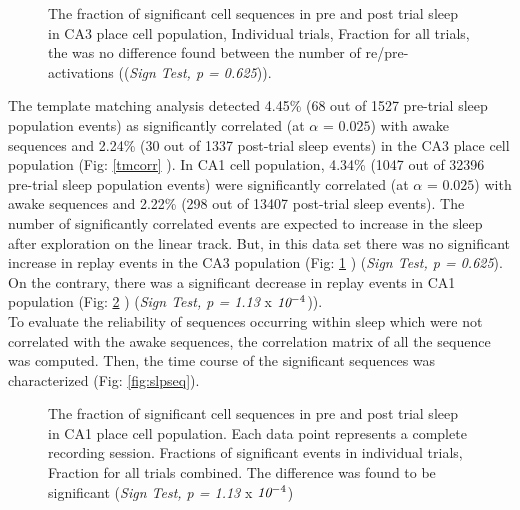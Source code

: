 \begin{figure}[H!]
\centering
{}
\caption[Pre and post trial sleep events CA3]{The fraction of significant cell sequences in pre and post trial sleep in CA3 place cell population,  Individual trials,  Fraction for all trials, the was no difference found between the number of re/pre-activations ((\emph{Sign Test, p = 0.625})).}
\label{fig:pre2postca3}
\end{figure}
The template matching analysis detected 4.45\% (68 out of 1527 pre-trial sleep population events) as significantly correlated (at $ \alpha $ = $0.025$) with awake sequences and 2.24\% (30 out of 1337 post-trial sleep events) in the CA3 place cell population (Fig: \ref{tmcorr} ). In CA1 cell population, 4.34\% (1047 out of 32396 pre-trial sleep population events) were significantly correlated (at $ \alpha $ = $0.025$) with awake sequences and 2.22\% (298 out of 13407 post-trial sleep events). The number of significantly correlated events are expected to increase in the sleep after exploration on the linear track. But, in this data set there was no significant increase in replay events in the CA3 population (Fig: \ref{fig:pre2postca3} ) (\emph{Sign Test, p = 0.625}). On the contrary, there was a significant decrease in replay events in CA1 population (Fig: \ref{fig:pre2postca1} ) (\emph{Sign Test, p =  1.13} x $\emph{10}^{-4}$)).\\

To evaluate the reliability of sequences occurring within sleep which were not correlated with the awake sequences, the correlation matrix of all the sequence was computed. Then, the time course of the significant sequences was characterized (Fig: \ref{fig:slpseq}). 

\begin{figure}[H!]
\centering
{}
\caption[Pre and post trial sleep events CA1]{The fraction of significant cell sequences in pre and post trial sleep in CA1 place cell population. Each data point represents a complete recording session.  Fractions of significant events in individual trials,  Fraction for all trials combined. The difference was found to be significant (\emph{Sign Test, p = 1.13} x $\emph{10}^{-4}$)}
\label{fig:pre2postca1}
\end{figure}

